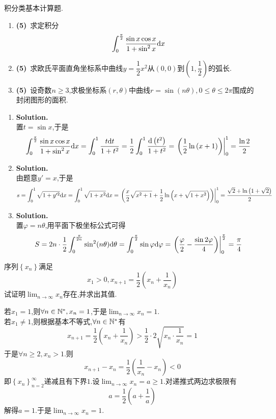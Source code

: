 \documentclass{ctexart}
\begin{document}
\begin{problem}[3.(15\songti{分})]
    积分类基本计算题.
    \begin{enumerate}[label=\textbf{(\arabic*)}]
        \item \textbf{(5)}\ 求定积分$$\int_{0}^{\frac{\pi}{2}}{\dfrac{\sin x\cos x}{1+\sin^2x}\mathrm{d} x}$$
        \item \textbf{(5)}\ 求欧氏平面直角坐标系中曲线$y=\dfrac{1}{2}x^2$从$(0,0)$到$\left(1,\dfrac{1}{2}\right)$的弧长.
        \item \textbf{(5)}\ 设奇数$n\geqslant3$,求极坐标系$(r,\theta)$中曲线$r=\sin(n\theta),0\leqslant\theta\leqslant2\pi$围成的封闭图形的面积.
    \end{enumerate}
\end{problem}
\begin{solution}
    \begin{enumerate}[label=\textbf{(\arabic*)}]
        \item \textbf{Solution.}\\
            置$t=\sin x$,于是
            $$\int_{0}^{\frac{\pi}{2}}{\dfrac{\sin x\cos x}{1+\sin^2x}\mathrm{d} x}=\int_0^1\dfrac{t\mathrm{d} t}{1+t^2}=\dfrac{1}{2}\int_0^1\dfrac{\mathrm{d}\left(t^2\right)}{1+t^2}=\left.\left(\dfrac{1}{2}\ln{(x+1)}\right)\right|_0^1=\dfrac{\ln2}{2}$$
        \item \textbf{Solution.}\\
            由题意$y'=x$,于是
            $$s=\int_0^1\sqrt{1+y'^2}\mathrm{d} x=\int_0^1\sqrt{1+x^2}\mathrm{d} x=\left.\left(\dfrac{x}{2}\sqrt{x^2+1}+\dfrac{1}{2}\ln\left(x+\sqrt{1+x^2}\right)\right)\right|_0^1=\dfrac{\sqrt{2}+\ln\left(1+\sqrt{2}\right)}{2}$$
        \item \textbf{Solution.}\\
            置$\varphi=n\theta$,用平面下极坐标公式可得
            $$S=2n\cdot\dfrac{1}{2}\int_{0}^{\frac{\pi}{2n}}\sin^2(n\theta)\mathrm{d}\theta=\int_{0}^{\frac{\pi}{2}}\sin\varphi\mathrm{d}\varphi=\left.\left(\dfrac{\varphi}{2}-\dfrac{\sin2\varphi}{4}\right)\right|_0^{\frac{\pi}{2}}=\dfrac{\pi}{4}$$
    \end{enumerate}
\end{solution}
\begin{problem}[3.(15\songti{分})]
    序列$\left\{x_n\right\}$满足
    $$x_1>0,x_{n+1}=\dfrac{1}{2}\left(x_n+\dfrac{1}{x_n}\right)$$
    试证明$\displaystyle\lim_{n\to\infty}x_n$存在,并求出其值.
\end{problem}
\begin{solution}[Proof.]
    若$x_1=1$,则$\forall n\in\mathbb{N}^*,x_n=1$,于是$\displaystyle\lim_{n\to\infty}x_n=1$.\\
    若$x_1\neq1$,则根据基本不等式,$\forall n\in\mathbb{N}^*$有$$x_{n+1}=\dfrac{1}{2}\left(x_n+\dfrac{1}{x_n}\right)>\dfrac{1}{2}\cdot2\sqrt{x_n\cdot\dfrac{1}{x_n}}=1$$
    于是$\forall n\geqslant2,x_n>1$.则
    $$x_{n+1}-x_n=\dfrac{1}{2}\left(\dfrac{1}{x_n}-x_n\right)<0$$
    即$\left\{x_n\right\}_{n=2}^{\infty}$递减且有下界$1$.设$\displaystyle\lim_{n\to\infty}x_n=a\geqslant1$.对递推式两边求极限有
    $$a=\dfrac{1}{2}\left(a+\dfrac{1}{a}\right)$$
    解得$a=1$.于是$\displaystyle\lim_{n\to\infty}x_n=1$.
\end{solution}
\end{document}
